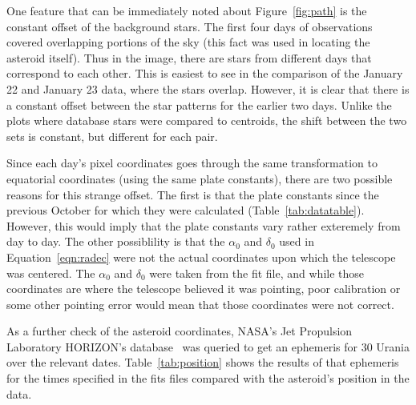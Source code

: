 \documentclass[a4paper,12pt]{article}
\begin{document}
One feature that can be immediately noted about Figure~\ref{fig:path} is the constant offset of the background stars. The first four days of observations covered overlapping portions of the sky (this fact was used in locating the asteroid itself). Thus in the image, there are stars from different days that correspond to each other. This is easiest to see in the comparison of the January 22 and January 23 data, where the stars overlap. However, it is clear that there is a constant offset between the star patterns for the earlier two days. Unlike the plots where database stars were compared to centroids, the shift between the two sets is constant, but different for each pair.

Since each day's pixel coordinates goes through the same transformation to equatorial coordinates (using the same plate constants), there are two possible reasons for this strange offset. The first is that the plate constants since the previous October for which they were calculated (Table~\ref{tab:datatable}). However, this would imply that the plate constants vary rather exteremely from day to day. The other possiblility is that the $\alpha_{0}$ and $\delta_{0}$ used in Equation~\ref{eqn:radec} were not the actual coordinates upon which the telescope was centered. The $\alpha_{0}$ and $\delta_{0}$ were taken from the fit file, and while those coordinates are where the telescope believed it was pointing, poor calibration or some other pointing error would mean that those coordinates were not correct.

As a further check of the asteroid coordinates, NASA's Jet Propulsion Laboratory HORIZON's database~\citep{urania} was queried to get an ephemeris for 30 Urania over the relevant dates. Table~\ref{tab:position} shows the results of that ephemeris for the times specified in the fits files compared with the asteroid's position in the data.
\end{document}
